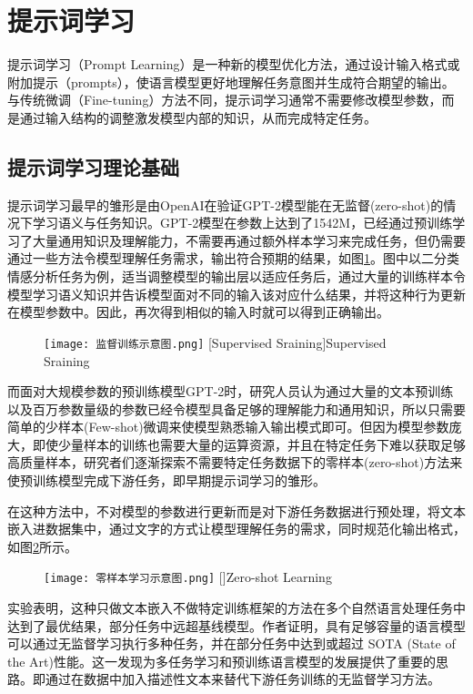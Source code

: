 \section{提示词学习}
提示词学习（Prompt Learning）是一种新的模型优化方法，通过设计输入格式或附加提示（prompts），使语言模型更好地理解任务意图并生成符合期望的输出。与传统微调（Fine-tuning）方法不同，提示词学习通常不需要修改模型参数，而是通过输入结构的调整激发模型内部的知识，从而完成特定任务。
\subsection{提示词学习理论基础}
提示词学习最早的雏形是由OpenAI在验证GPT-2模型能在无监督(zero-shot)的情况下学习语义与任务知识\cite{radfordLanguageModelsAre2019}。GPT-2模型在参数上达到了1542M，已经通过预训练学习了大量通用知识及理解能力，不需要再通过额外样本学习来完成任务，但仍需要通过一些方法令模型理解任务需求，输出符合预期的结果，如图\ref{fig:监督学习示意图}。图中以二分类情感分析任务为例，适当调整模型的输出层以适应任务后，通过大量的训练样本令模型学习语义知识并告诉模型面对不同的输入该对应什么结果，并将这种行为更新在模型参数中。因此，再次得到相似的输入时就可以得到正确输出。
\begin{figure}[!htbp]
  \centering
  \texttt{[image: 监督训练示意图.png]}
  [Supervised Sraining]{Supervised Sraining}
  \label{fig:监督学习示意图}
\end{figure}

而面对大规模参数的预训练模型GPT-2时，研究人员认为通过大量的文本预训练以及百万参数量级的参数已经令模型具备足够的理解能力和通用知识，所以只需要简单的少样本(Few-shot)微调来使模型熟悉输入输出模式即可。但因为模型参数庞大，即使少量样本的训练也需要大量的运算资源，并且在特定任务下难以获取足够高质量样本，研究者们逐渐探索不需要特定任务数据下的零样本(zero-shot)方法来使预训练模型完成下游任务，即早期提示词学习的雏形。

在这种方法中，不对模型的参数进行更新而是对下游任务数据进行预处理，将文本嵌入进数据集中，通过文字的方式让模型理解任务的需求，同时规范化输出格式，如图\ref{fig: 零样本学习示意图}所示。
\begin{figure}[!htbp]
  \centering
  \texttt{[image: 零样本学习示意图.png]}
  []{Zero-shot Learning}
  \label{fig: 零样本学习示意图}
\end{figure}

实验表明，这种只做文本嵌入不做特定训练框架的方法在多个自然语言处理任务中达到了最优结果，部分任务中远超基线模型。作者证明，具有足够容量的语言模型可以通过无监督学习执行多种任务，并在部分任务中达到或超过 SOTA (State of the Art)性能。这一发现为多任务学习和预训练语言模型的发展提供了重要的思路。即通过在数据中加入描述性文本来替代下游任务训练的无监督学习方法。

